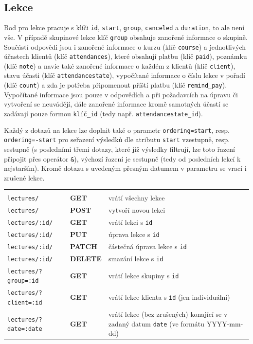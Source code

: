         \subsection{Lekce}
        Bod pro lekce pracuje s klíči \verb|id|, \verb|start|, \verb|group|, \verb|canceled| a \verb|duration|, to ale není vše. V případě skupinové lekce klíč \verb|group| obsahuje zanořené informace o skupině. Součástí odpovědi jsou i zanořené informace o kurzu (klíč \verb|course|) a jednotlivých účastech klientů (klíč \verb|attendances|), které obsahují platbu (klíč \verb|paid|), poznámku (klíč \verb|note|) a navíc také zanořené informace o každém z klientů (klíč \verb|client|), stavu účasti (klíč \verb|attendancestate|), vypočítané informace o číslu lekce v pořadí (klíč \verb|count|) a zda je potřeba připomenout příští platbu (klíč \verb|remind_pay|). Vypočítané informace jsou pouze v odpovědích a při požadavcích na úpravu či vytvoření se neuvádějí, dále zanořené informace kromě samotných účastí se zadávají pouze formou \verb|klíč_id| (tedy např. \verb|attendancestate_id|).
        
        Každý z dotazů na lekce lze doplnit také o parametr \verb|ordering=start|, resp. \verb|ordering=-start| pro seřazení výsledků dle atributu \verb|start| vzestupně, resp. sestupně (s posledními třemi dotazy, které již výsledky filtrují, lze toto řazení připojit přes operátor \verb|&|), výchozí řazení je sestupně (tedy od posledních lekcí k nejstarším). Kromě dotazu s uvedeným přesným datumem v parametru se vrací i zrušené lekce.
        
            {\centering
            \begin{tabular}{p{\apiA\textwidth} p{\apiB\textwidth} p{\apiC\textwidth}}&&\\
                \verb|lectures/|            & \textbf{GET}      & vrátí všechny lekce\\
                \verb|lectures/|            & \textbf{POST}     & vytvoří novou lekci\\
                \verb|lectures/:id/|        & \textbf{GET}      & vrátí lekci s \verb|id|\\
                \verb|lectures/:id/|        & \textbf{PUT}      & úprava lekce s \verb|id|\\
                \verb|lectures/:id/|        & \textbf{PATCH}    & částečná úprava lekce s \verb|id|\\
                \verb|lectures/:id/|        & \textbf{DELETE}   & smazání lekce s \verb|id|\\
                \verb|lectures/?group=:id|  & \textbf{GET}      & vrátí lekce skupiny s \verb|id|\\
                \verb|lectures/?client=:id| & \textbf{GET}      & vrátí lekce klienta s \verb|id| (jen individuální)\\
                \verb|lectures/?date=:date| & \textbf{GET}      & vrátí lekce (bez zrušených) konající se v zadaný datum \verb|date| (ve formátu YYYY-mm-dd)\\
            \end{tabular}}
        
